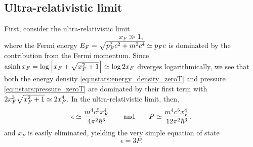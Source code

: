\subsection{Ultra-relativistic limit}
\label{sec:nstars:ur_limit}

First, consider the ultra-relativistic limit
\begin{equation}
	x_F \gg 1 , 
\label{eq:nstars:ur_limit}
\end{equation}
where the Fermi energy $E_F = \sqrt{p_F^2 c^2 + m^2 c^4} \simeq p_F c$ is dominated by the contribution from the Fermi momentum.
Since $\operatorname{asinh} x_F = \log \left[ x_F + \sqrt{x_F^2 + 1} \right] \simeq \log 2 x_F$ diverges logarithmically, we see that both the energy density \eqref{eq:nstars:energy_density_zeroT} and pressure \eqref{eq:nstars:pressure_zeroT} are dominated by their first term with $2 x_F^3 \sqrt{x_F^2 + 1} \simeq 2 x_F^4$.
In the ultra-relativistic limit, then,
\begin{equation}
	\epsilon \simeq \frac{m^4 c^5 x_F^4}{4 \pi^2 \hbar^3}
	\qquad \text{and} \qquad
	P        \simeq \frac{m^4 c^5 x_F^4}{12 \pi^2 \hbar^3},
\end{equation}
and $x_F$ is easily eliminated, yielding the very simple equation of state
\begin{equation}
	\epsilon = 3 P .
\label{eq:nstars:ur_eos}
\end{equation}

